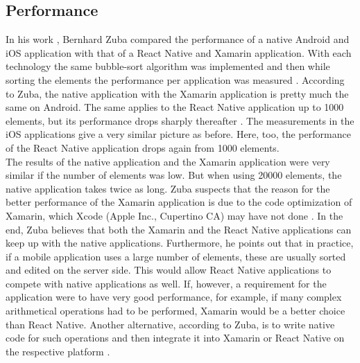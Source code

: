 \documentclass[Bachelor,BIF,english]{twbook}
\begin{document}
\subsection{Performance}
In his work \cite{ZubaBernhard2017EdPb}, Bernhard Zuba compared the performance of a native Android and iOS application with that of a React Native and Xamarin application. With each technology the same bubble-sort algorithm was implemented and then while sorting the elements the performance per application was measured \cite[p.~30]{ZubaBernhard2017EdPb}. According to Zuba, the native application with the Xamarin application is pretty much the same on Android. The same applies to the React Native application up to 1000 elements, but its performance drops sharply thereafter \cite[p.~30]{ZubaBernhard2017EdPb}. The measurements in the iOS applications give a very similar picture as before. Here, too, the performance of the React Native application drops again from 1000 elements. 
\\[\baselineskip]
The results of the native application and the Xamarin application were very similar if the number of elements was low. But when using 20000 elements, the native application takes twice as long. Zuba suspects that the reason for the better performance of the Xamarin application is due to the code optimization of Xamarin, which Xcode (Apple Inc., Cupertino CA) may have not done \cite[p.~31]{ZubaBernhard2017EdPb}. In the end, Zuba believes that both the Xamarin and the React Native applications can keep up with the native applications. Furthermore, he points out that in practice, if a mobile application uses a large number of elements, these are usually sorted and edited on the server side. This would allow React Native applications to compete with native applications as well. If, however, a requirement for the application were to have very good performance, for example, if many complex arithmetical operations had to be performed, Xamarin would be a better choice than React Native. Another alternative, according to Zuba, is to write native code for such operations and then integrate it into Xamarin or React Native on the respective platform \cite[p.~32]{ZubaBernhard2017EdPb}.
\end{document}
